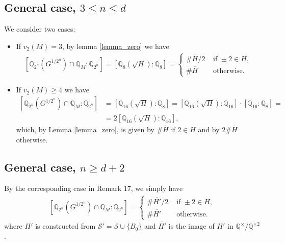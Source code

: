 \documentclass[10pt,a4paper]{article}
\theoremstyle{definition}
\begin{document}
\subsection{General case, $3\leq n\leq d$}
We consider two cases:
\begin{itemize}
\item If $v_2(M)=3$, by lemma \ref{lemma_zero} we have
\begin{align*}
\left[\mathbb{Q}_{2^n}\left(G^{1/2^n}\right)\cap \mathbb{Q}_M:\mathbb{Q}_{2^n}\right]=\left[\mathbb{Q}_8\left(\sqrt{H}\right):\mathbb{Q}_8\right]=\begin{cases}
\#\overline H/2 & \text{ if }\pm 2\in H,\\
\#\overline H&\text{ otherwise}.
\end{cases}
\end{align*}
\item If $v_2(M)\geq 4$ we have
\begin{align*}
\left[\mathbb{Q}_{2^n}\left(G^{1/2^n}\right)\cap \mathbb{Q}_M:\mathbb{Q}_{2^n}\right]&=\left[\mathbb{Q}_{16}\left(\sqrt{H}\right):\mathbb{Q}_8\right]=\left[\mathbb{Q}_{16}\left(\sqrt{H}\right):\mathbb{Q}_{16}\right]\cdot \left[\mathbb{Q}_{16}:\mathbb{Q}_8\right]=\\&=2\left[\mathbb{Q}_{16}\left(\sqrt{H}\right):\mathbb{Q}_{16}\right],
\end{align*}
which, by Lemma \ref{lemma_zero}, is given by $\#\overline{H}$ if $2 \in H$ and by $2\#\overline{H}$ otherwise.
\end{itemize}

\subsection{General case, $n\geq d+2$}
By the corresponding case in Remark 17, we simply have
\begin{align*}
\left[\mathbb{Q}_{2^n}\left(G^{1/2^n}\right)\cap \mathbb{Q}_M:\mathbb{Q}_{2^n}\right]=\begin{cases}
\#\overline {H'}/2 & \text{ if }\pm 2\in H,\\
\#\overline {H'}&\text{ otherwise}.
\end{cases}
\end{align*}
where $H'$ is constructed from $\mathcal{S}'=\mathcal{S}\cup\{B_0\}$ and $\overline{H'}$ is the image of $H'$ in $\mathbb{Q}^\times/\mathbb{Q}^{\times 2}$.
\end{document}
